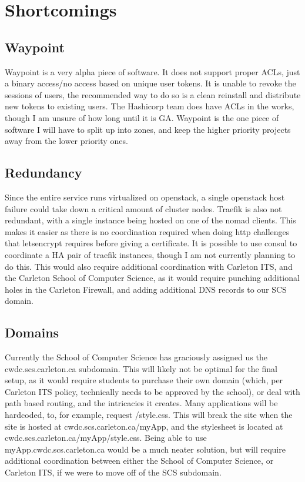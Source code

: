 \documentclass{article}
\begin{document}
\section{Shortcomings}
\subsection{Waypoint}
Waypoint is a very alpha piece of software. It does not support proper ACLs, just a binary access/no access based on unique user tokens. It is unable to revoke the sessions of users, the recommended way to do so is a clean reinstall and distribute new tokens to existing users. The Hashicorp team does have ACLs in the works, though I am unsure of how long until it is GA. Waypoint is the one piece of software I will have to split up into zones, and keep the higher priority projects away from the lower priority ones. 
\subsection{Redundancy}
Since the entire service runs virtualized on openstack, a single openstack host failure could take down a critical amount of cluster nodes. Traefik is also not redundant, with a single instance being hosted on one of the nomad clients. This makes it easier as there is no coordination required when doing http challenges that letsencrypt requires before giving a certificate. It is possible to use consul to coordinate a HA pair of traefik instances, though I am not currently planning to do this. This would also require additional coordination with Carleton ITS, and the Carleton School of Computer Science, as it would require punching additional holes in the Carleton Firewall, and adding additional DNS records to our SCS domain.
\subsection{Domains}
Currently the School of Computer Science has graciously assigned us the cwdc.scs.carleton.ca subdomain. This will likely not be optimal for the final setup, as it would require students to purchase their own domain (which, per Carleton ITS policy, technically needs to be approved by the school), or deal with path based routing, and the intricacies it creates. Many applications will be hardcoded, to, for example, request /style.css. This will break the site when the site is hosted at cwdc.scs.carleton.ca/myApp, and the stylesheet is located at cwdc.scs.carleton.ca/myApp/style.css. Being able to use myApp.cwdc.scs.carleton.ca would be a much neater solution, but will require additional coordination between either the School of Computer Science, or Carleton ITS, if we were to move off of the SCS subdomain.
\end{document}
